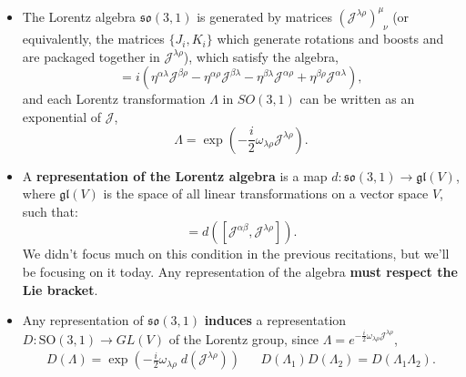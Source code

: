 \documentclass[12pt, oneside]{article}   	%
\theoremstyle{definition}
\begin{document}
\begin{itemize}
	\item The Lorentz algebra $\mathfrak{so}(3, 1)$ is generated by matrices $(\mathcal J^{\lambda\rho})^\mu_{\;\;\nu}$ (or equivalently, the matrices $\{J_i, K_i\}$ which generate rotations and boosts and are packaged together in $\mathcal J^{\lambda\rho}$), which satisfy the algebra,
	\begin{equation}
		[\mathcal J^{\alpha\beta}, \mathcal J^{\rho\lambda}] = i\left( \eta^{\alpha\lambda} \mathcal J^{\beta\rho} - \eta^{\alpha\rho} \mathcal J^{\beta \lambda} - \eta^{\beta\lambda} \mathcal J^{\alpha\rho} + \eta^{\beta\rho} \mathcal J^{\alpha\lambda} \right) , \label{eq:alg}
	\end{equation}
	and each Lorentz transformation $\Lambda$ in $SO(3, 1)$ can be written as an exponential of $\mathcal J$,
	\begin{equation}
		\Lambda = \exp\left( -\frac{i}{2} \omega_{\lambda\rho}\mathcal J^{\lambda\rho} \right).
	\end{equation}
	\item A \textbf{representation of the Lorentz algebra} is a map $d : \mathfrak{so}(3, 1)\rightarrow\mathfrak{gl}(V)$, where $\mathfrak{gl}(V)$ is the space of all linear transformations on a vector space $V$, such that:
	\begin{equation}
		[d(\mathcal J^{\alpha\beta} ), d(\mathcal J^{\lambda\rho} )] = d([\mathcal J^{\alpha\beta}, \mathcal J^{\lambda\rho}]). \label{eq:lorentz_algebra}
	\end{equation}
	We didn't focus much on this condition in the previous recitations, but we'll be focusing on it today. Any representation of the algebra \textbf{must respect the Lie bracket}. 

	\item Any representation of $\mathfrak{so}(3, 1)$ \textbf{induces} a representation $D : \mathrm{SO}(3, 1)\rightarrow GL(V)$ of the Lorentz group, since $\Lambda = e^{-\frac{i}{2} \omega_{\lambda\rho} \mathcal J^{\lambda\rho}}$,
	\vspace{-0.25cm}
	\begin{align}
		D(\Lambda) = \exp\left(-\frac{i}{2} \omega_{\lambda\rho}\; d(\mathcal J^{\lambda\rho})\right) && D(\Lambda_1)D(\Lambda_2) = D(\Lambda_1\Lambda_2). \label{eq:repr_transformation}
	\end{align}
	\vspace{-0.5cm}
	

\end{itemize}
\end{document}
